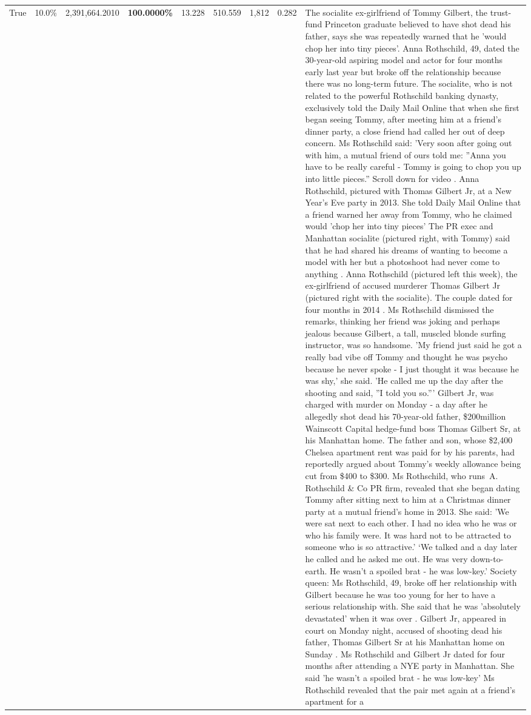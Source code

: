 \begin{table}[H]
\begin{tabular}{lllrlllll}
True & 10.0\% & 2,391,664.2010 & \bfseries \color{red} 100.0000\% & 13.228 & 510.559 & 1,812 & 0.282 & The socialite ex-girlfriend of Tommy Gilbert, the trust-fund Princeton graduate believed to have shot dead his father, says she was repeatedly warned that he 'would chop her into tiny pieces'. Anna Rothschild, 49, dated the 30-year-old aspiring model and actor for four months early last year but broke off the relationship because there was no long-term future. The socialite, who is not related to the powerful Rothschild banking dynasty, exclusively told the Daily Mail Online that when she first began seeing Tommy, after meeting him at a friend's dinner party, a close friend had called her out of deep concern. Ms Rothschild said: 'Very soon after going out with him, a mutual friend of ours told me: ''Anna you have to be really careful - Tommy is going to chop you up into little pieces.'' Scroll down for video . Anna Rothschild, pictured with Thomas Gilbert Jr, at a New Year's Eve party in 2013. She told Daily Mail Online that a friend warned her away from Tommy, who he claimed would 'chop her into tiny pieces' The PR exec and Manhattan socialite (pictured right, with Tommy) said that he had shared his dreams of wanting to become a model with her but a photoshoot had never come to anything . Anna Rothschild (pictured left this week), the ex-girlfriend of accused murderer Thomas Gilbert Jr (pictured right with the socialite). The couple dated for four months in 2014 . Ms Rothschild dismissed the remarks, thinking her friend was joking and perhaps jealous because Gilbert, a tall, muscled blonde surfing instructor, was so handsome. 'My friend just said he got a really bad vibe off Tommy and thought he was psycho because he never spoke - I just thought it was because he was shy,' she said. 'He called me up the day after the shooting and said, ''I told you so.''' Gilbert Jr, was charged with murder on Monday - a day after he allegedly shot dead his 70-year-old father, \$200million Wainscott Capital hedge-fund boss Thomas Gilbert Sr, at his Manhattan home. The father and son, whose \$2,400 Chelsea apartment rent was paid for by his parents, had reportedly argued about Tommy's weekly allowance being cut from \$400 to \$300. Ms Rothschild, who runs A. Rothschild \& Co PR firm, revealed that she began dating Tommy after sitting next to him at a Christmas dinner party at a mutual friend's home in 2013. She said: 'We were sat next to each other. I had no idea who he was or who his family were. It was hard not to be attracted to someone who is so attractive.' ‘We talked and a day later he called and he asked me out. He was very down-to-earth. He wasn’t a spoiled brat - he was low-key.’ Society queen: Ms Rothschild, 49, broke off her relationship with Gilbert because he was too young for her to have a serious relationship with. She said that he was 'absolutely devastated' when it was over . Gilbert Jr, appeared in court on Monday night, accused of shooting dead his father, Thomas Gilbert Sr at his Manhattan home on Sunday . Ms Rothschild and Gilbert Jr dated for four months after attending a NYE party in Manhattan. She said 'he wasn't a spoiled brat - he was low-key' Ms Rothschild revealed that the pair met again at a friend’s apartment for a 
\end{tabular}
\end{table}
